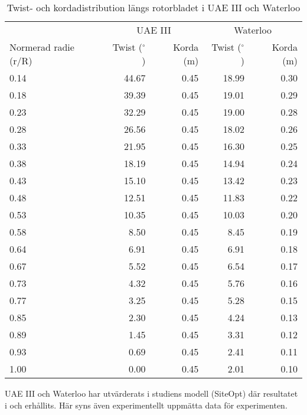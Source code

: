 \bigskip\bigskip\bigskip\bigskip\bigskip\bigskip\bigskip\bigskip\bigskip
\begin{table}[!h]

  \centering
  
  
\begin{tabular}{lrrrr}
\toprule
      & \multicolumn{2}{c}{UAE III} & \multicolumn{2}{c}{Waterloo} \\ \cline{2-5} 
Normerad radie (r/R) & Twist ($^{\circ}$)        & Korda (m)        & Twist ($^{\circ}$)         & Korda (m)         \\
    \midrule
    0.14   & 44.67 & 0.45 & 18.99 & 0.30 \\
    0.18 & 39.39  & 0.45  & 19.01 & 0.29\\
    0.23 & 32.29  & 0.45  & 19.00 & 0.28\\
    0.28 & 26.56  & 0.45 & 18.02 & 0.26 \\
    0.33 & 21.95  & 0.45  & 16.30 & 0.25\\
    0.38 & 18.19  & 0.45 & 14.94 & 0.24 \\
    0.43 & 15.10  & 0.45 & 13.42 & 0.23 \\
    0.48 & 12.51  & 0.45 & 11.83 & 0.22 \\
    0.53 & 10.35  & 0.45 & 10.03 & 0.20 \\
    0.58 & 8.50  & 0.45 & 8.45 & 0.19 \\
    0.64 & 6.91  & 0.45 & 6.91 & 0.18 \\
    0.67 & 5.52  & 0.45 & 6.54 & 0.17 \\
    0.73 & 4.32  & 0.45 & 5.76 & 0.16 \\
    0.77 & 3.25  & 0.45 & 5.28 & 0.15 \\
    0.85 & 2.30  & 0.45 & 4.24 & 0.13 \\
    0.89 & 1.45  & 0.45 & 3.31 & 0.12 \\
    0.93 & 0.69  & 0.45 & 2.41 & 0.11 \\
    1.00 & 0.00  & 0.45 & 2.01 & 0.10 \\
\bottomrule
\end{tabular}


  \caption{Twist- och kordadistribution längs rotorbladet i UAE III \citep{UAE} och Waterloo \citep{Canada}}
  \label{twist}
\end{table}

\pagebreak

UAE III och Waterloo har utvärderats i studiens modell (SiteOpt) där resultatet i  och  erhållits. Här syns även  experimentellt uppmätta data för experimenten. 

